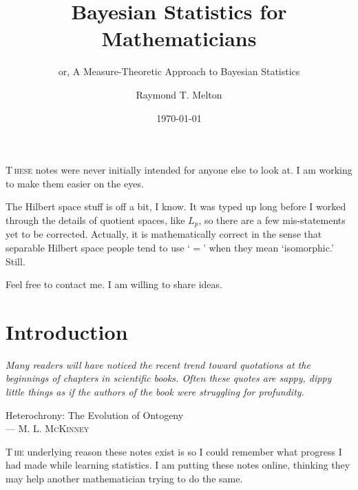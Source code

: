 \documentclass[
twoside=true,
paper=letter,
fontsize=9pt,
pagesize=auto,
leqno,
openany,
headsepline,
overfullrule,
]{scrbook}
\title{Bayesian Statistics for Mathematicians}
\subtitle{or, A Measure-Theoretic Approach to Bayesian Statistics}
\author{\textsf{Raymond T. Melton}}
\date{\textsf{\today}}
\theoremstyle{plain}
\theoremstyle{plain}
\theoremstyle{definition}
\theoremstyle{bfnoteitalic}
\theoremstyle{bfnoteroman}
\begin{document}
\frontmatter



\maketitle
{\renewcommand*\normalfont{}%
\normalfont%
\tableofcontents
}


\lettrine{T}{\,hese} notes were never initially intended for anyone else to look at.
I am working to make them easier on the eyes.

The Hilbert space stuff is off a bit, I know.
It was typed up long before I worked through the details of quotient spaces, like $L_p$, so there are a few mis-statements yet to be corrected. Actually, it is mathematically correct in the sense that separable Hilbert space people tend to use `$=$' when they mean `isomorphic.' Still.

Feel free to contact me. I am willing to share ideas.



\mainmatter
\chapter{Introduction}
\epigraph{\textit{Many readers will have noticed the recent trend toward quotations at the beginnings of chapters in scientific books.  Often these quotes are sappy, dippy little things as if the authors of the book were struggling for profundity.}}
{{Heterochrony: The Evolution of Ontogeny}\\ \textsc{--- M. L. McKinney}}

\lettrine{T}{\,he} underlying reason these notes exist is so I could remember what progress I had made while learning statistics.
I am putting these notes online, thinking  they may help another mathematician trying to do the same.
\end{document}
